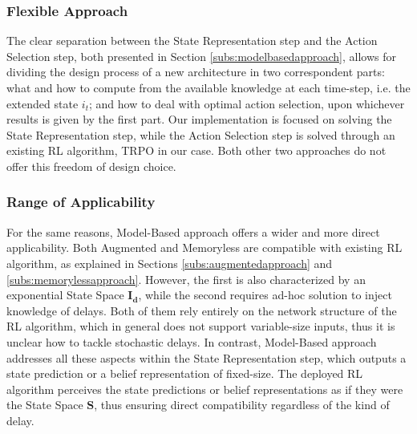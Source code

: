             \subsubsection{Flexible Approach}
                The clear separation between the State Representation step and the Action Selection step, both presented in Section \ref{subs:modelbasedapproach}, allows for dividing the design process of a new architecture in two correspondent parts: what and how to compute from the available knowledge at each time-step, i.e. the extended state $i_t$; and how to deal with optimal action selection, upon whichever results is given by the first part. Our implementation is focused on solving the State Representation step, while the Action Selection step is solved through an existing RL algorithm, TRPO in our case. Both other two approaches do not offer this freedom of design choice.
                
            \subsubsection{Range of Applicability}
                For the same reasons, Model-Based approach offers a wider and more direct applicability. Both Augmented and Memoryless are compatible with existing RL algorithm, as explained in Sections \ref{subs:augmentedapproach} and \ref{subs:memorylessapproach}. However, the first is also characterized by an exponential State Space $\mathbf{I_d}$, while the second requires ad-hoc solution to inject knowledge of delays. Both of them rely entirely on the network structure of the RL algorithm, which in general does not support variable-size inputs, thus it is unclear how to tackle stochastic delays. In contrast, Model-Based approach addresses all these aspects within the State Representation step, which outputs a state prediction or a belief representation of fixed-size. The deployed RL algorithm perceives the state predictions or belief representations as if they were the State Space $\mathbf{S}$, thus ensuring direct compatibility regardless of the kind of delay.
                
